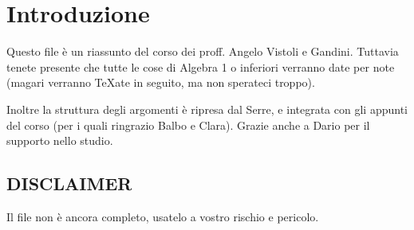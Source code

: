 \section*{Introduzione}
  Questo file è un riassunto del corso dei proff. Angelo Vistoli e Gandini. Tuttavia tenete presente che tutte le cose di Algebra 1 o inferiori verranno date per note (magari verranno \TeX ate in seguito, ma non sperateci troppo).
  
  Inoltre la struttura degli argomenti è ripresa dal Serre, e integrata con gli appunti del corso (per i quali ringrazio Balbo e Clara).
	Grazie anche a Dario per il supporto nello studio.
  \subsection*{DISCLAIMER}
    Il file non è ancora completo, usatelo a vostro rischio e pericolo.
